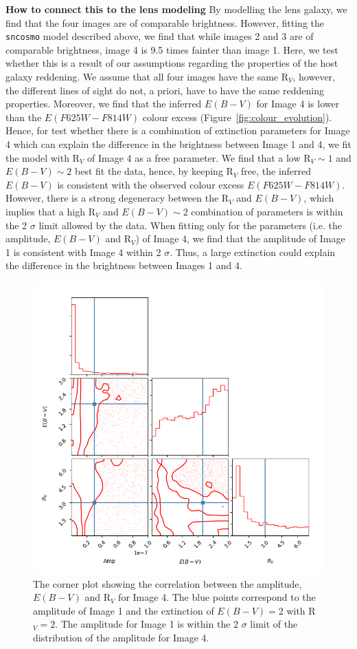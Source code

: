 \documentclass[a4paper,fleqn,usenatbib]{mnras}
\begin{document}
{\bf How to connect this to the lens modeling}
By modelling the lens galaxy, we find that the four images are of comparable brightness. However, fitting the \texttt{sncosmo} model described above, we find that while images 2 and 3 are of comparable brightness, image 4 is 9.5 times fainter than image 1. Here, we test whether this is a result of our assumptions regarding the properties of the host galaxy reddening. We assume that all four images have the same R$_V$, however, the different lines of sight do not, a priori, have to have the same reddening properties. Moreover, we find that the inferred $E(B-V)$ for Image 4 is lower than the $E(F625W - F814W)$ colour excess (Figure~\ref{fig:colour_evolution}). Hence,
for test whether there is a combination of extinction parameters for Image 4 which can explain the difference in the brightness between Image 1 and 4, we fit the model with R$_V$ of Image 4 as a free parameter. We find that a low R$_V \sim 1$ and $E(B-V) \sim 2$ best fit the data, hence, by keeping R$_V$ free, the inferred $E(B-V)$ is consistent with the observed colour excess $E(F625W - F814W)$. However, there is a strong degeneracy between the R$_V$ and $E(B-V)$, which implies that a high R$_V$ and $E(B-V) \sim 2$ combination of parameters is within the 2 $\sigma$ limit allowed by the data. When fitting only for the parameters (i.e. the amplitude, $E(B-V)$ and R$_V$) of Image 4, we find that the amplitude of Image 1 is consistent with Image 4 within 2 $\sigma$. Thus, a large extinction could explain the difference in the brightness between Images 1 and 4.
\begin{figure}
    \centering
    \includegraphics[width=.5\textwidth]{corner_amp_Image4.png}
    \caption{The corner plot showing the correlation between the amplitude, $E(B-V)$ and R$_V$ for Image 4. The blue points correspond to the amplitude of Image 1 and the extinction of $E(B-V) = 2$ with R$_V = 2$. The amplitude for Image 1 is within the 2 $\sigma$ limit of the distribution of the amplitude for Image 4.}
    \label{fig:corner_Image4}
\end{figure}
 
\end{document}
